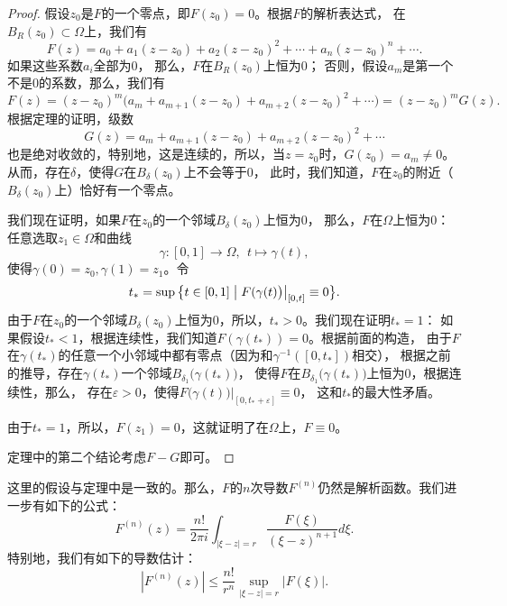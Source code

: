 \begin{proof}
假设$z_0$是$F$的一个零点，即$F(z_0)=0$。根据$F$的解析表达式，
在$B_{R}(z_0)\subset \Omega$上，我们有
\begin{equation*} 
F(z)=a_0 + a_{1}(z-z_0)+a_{2}(z-z_0)^2+\cdots+a_n(z-z_0)^n+\cdots.
\end{equation*}
如果这些系数$a_i$全部为$0$， 那么，$F$在$B_{R}(z_0)$上恒为$0$；
否则，假设$a_m$是第一个不是$0$的系数，那么，我们有
\begin{equation*}
F(z)=(z-z_0)^m\big(a_m + a_{m+1}(z-z_0)+a_{m+2}(z-z_0)^2+\cdots\big)=(z-z_0)^mG(z).
\end{equation*}
根据定理的证明，级数
\[G(z)=a_m + a_{m+1}(z-z_0)+a_{m+2}(z-z_0)^2+\cdots\]
也是绝对收敛的，特别地，这是连续的，所以，当$z=z_0$时，$G(z_0)=a_m\neq 0$。
从而，存在$\delta$，使得$G$在$B_{\delta}(z_0)$上不会等于$0$，
此时，我们知道，$F$在$z_0$的附近（$B_{\delta}(z_0)$上）恰好有一个零点。

我们现在证明，如果$F$在$z_0$的一个邻域$B_{\delta}(z_0)$上恒为$0$，
那么，$F$在$\Omega$上恒为$0$：任意选取$z_1 \in \Omega$和曲线
\[\gamma\colon[0,1]\rightarrow \Omega, \ \ t\mapsto \gamma(t),\]
使得$\gamma(0)=z_0,\gamma(1)=z_1$。令
\[t_*=\sup\big\{t\in [0,1]\bigm| F(\gamma(t)\big)\big|_{[0,t]}\equiv 0\big\}.\]
由于$F$在$z_0$的一个邻域$B_{\delta}(z_0)$上恒为$0$，所以，$t_*>0$。我们现在证明$t_*=1$：
如果假设$t_*<1$，根据连续性，我们知道$F(\gamma(t_*))=0$。根据前面的构造，
由于$F$在$\gamma(t_*)$的任意一个小邻域中都有零点（因为和$\gamma^{-1}([0,t_*])$相交），
根据之前的推导，存在$\gamma(t_*)$一个邻域$B_{\delta_1}\big(\gamma(t_*)\big)$，
使得$F$在$B_{\delta_1}\big(\gamma(t_*)\big)$上恒为$0$，根据连续性，那么，
存在$\varepsilon>0$，使得$F(\gamma(t)\big)\big|_{[0,t_*+\varepsilon]}\equiv 0$，
这和$t_*$的最大性矛盾。

由于$t_*=1$，所以，$F(z_1)=0$，这就证明了在$\Omega$上，$F\equiv 0$。

定理中的第二个结论考虑$F-G$即可。
\end{proof}
\begin{corollary}
这里的假设与定理中是一致的。那么，$F$的$n$次导数$F^{(n)}$仍然是解析函数。我们进一步有如下的公式：
\begin{equation*}
F^{(n)}(z)=\frac{n!}{2\pi i}\int_{|\xi-z|=r}\frac{F(\xi)}{(\xi-z)^{n+1}}d\xi.
\end{equation*}
特别地，我们有如下的导数估计：
\begin{equation*}
|F^{(n)}(z)|\leqslant \frac{n!}{r^n}\sup_{|\xi-z|=r}|F(\xi)|.
\end{equation*}
\end{corollary}
